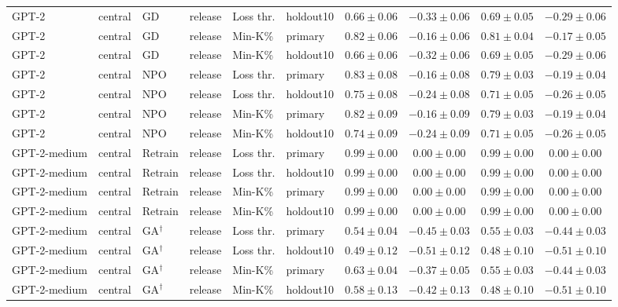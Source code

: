\begin{table}[t]
\begin{tabular*}{\textwidth}{@{\extracolsep{\fill}}llllllcccc@{}}
GPT-2 & central & GD & release & Loss thr. & holdout10 & $0.66 \pm 0.06$ & $-0.33 \pm 0.06$ & $0.69 \pm 0.05$ & $-0.29 \pm 0.06$ \\
GPT-2 & central & GD & release & Min-K\% & primary & $0.82 \pm 0.06$ & $-0.16 \pm 0.06$ & $0.81 \pm 0.04$ & $-0.17 \pm 0.05$ \\
GPT-2 & central & GD & release & Min-K\% & holdout10 & $0.66 \pm 0.06$ & $-0.32 \pm 0.06$ & $0.69 \pm 0.05$ & $-0.29 \pm 0.06$ \\
GPT-2 & central & NPO & release & Loss thr. & primary & $0.83 \pm 0.08$ & $-0.16 \pm 0.08$ & $0.79 \pm 0.03$ & $-0.19 \pm 0.04$ \\
GPT-2 & central & NPO & release & Loss thr. & holdout10 & $0.75 \pm 0.08$ & $-0.24 \pm 0.08$ & $0.71 \pm 0.05$ & $-0.26 \pm 0.05$ \\
GPT-2 & central & NPO & release & Min-K\% & primary & $0.82 \pm 0.09$ & $-0.16 \pm 0.09$ & $0.79 \pm 0.03$ & $-0.19 \pm 0.04$ \\
GPT-2 & central & NPO & release & Min-K\% & holdout10 & $0.74 \pm 0.09$ & $-0.24 \pm 0.09$ & $0.71 \pm 0.05$ & $-0.26 \pm 0.05$ \\
GPT-2-medium & central & Retrain & release & Loss thr. & primary & $0.99 \pm 0.00$ & $0.00 \pm 0.00$ & $0.99 \pm 0.00$ & $0.00 \pm 0.00$ \\
GPT-2-medium & central & Retrain & release & Loss thr. & holdout10 & $0.99 \pm 0.00$ & $0.00 \pm 0.00$ & $0.99 \pm 0.00$ & $0.00 \pm 0.00$ \\
GPT-2-medium & central & Retrain & release & Min-K\% & primary & $0.99 \pm 0.00$ & $0.00 \pm 0.00$ & $0.99 \pm 0.00$ & $0.00 \pm 0.00$ \\
GPT-2-medium & central & Retrain & release & Min-K\% & holdout10 & $0.99 \pm 0.00$ & $0.00 \pm 0.00$ & $0.99 \pm 0.00$ & $0.00 \pm 0.00$ \\
GPT-2-medium & central & GA$^{\dagger}$ & release & Loss thr. & primary & $0.54 \pm 0.04$ & $-0.45 \pm 0.03$ & $0.55 \pm 0.03$ & $-0.44 \pm 0.03$ \\
GPT-2-medium & central & GA$^{\dagger}$ & release & Loss thr. & holdout10 & $0.49 \pm 0.12$ & $-0.51 \pm 0.12$ & $0.48 \pm 0.10$ & $-0.51 \pm 0.10$ \\
GPT-2-medium & central & GA$^{\dagger}$ & release & Min-K\% & primary & $0.63 \pm 0.04$ & $-0.37 \pm 0.05$ & $0.55 \pm 0.03$ & $-0.44 \pm 0.03$ \\
GPT-2-medium & central & GA$^{\dagger}$ & release & Min-K\% & holdout10 & $0.58 \pm 0.13$ & $-0.42 \pm 0.13$ & $0.48 \pm 0.10$ & $-0.51 \pm 0.10$ \\

\end{tabular*}
\end{table}
